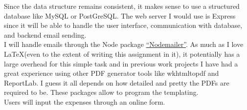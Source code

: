 \documentclass{homework}
\begin{document}
\begin{solution}
    Since the data structure remains consistent, it makes sense to use a structured database like MySQL or PostGreSQL. The web server I would use is Express since it will be able to handle the user interface, communication with database, and backend email sending.\\

    I will handle emails through the Node package \href{https://nodemailer.com/}{``Nodemailer''}. As much as I love \LaTeX (even to the extent of writing this assignment in it), it potentially has a large overhead for this simple task and in previous work projects I have had a great experience using other PDF generator tools like wkhtmltopdf and ReportLab. I guess it all depends on how detailed and pretty the PDFs are required to be. These packages allow to program the templating.\\

    Users will input the expenses through an online form. 

\end{solution}
\end{document}
